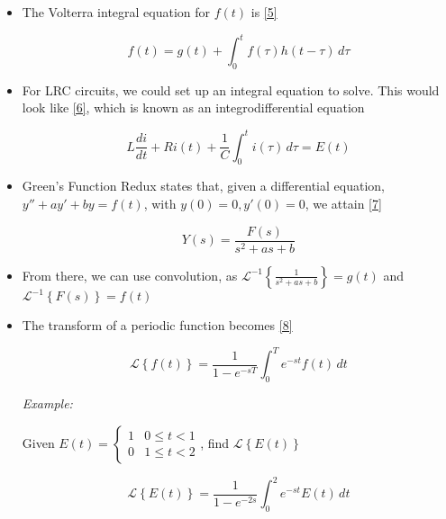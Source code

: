 \documentclass[12pt]{article}
\begin{document}
\begin{itemize}
  \item The Volterra integral equation for $f(t)$ is \eqref{5}

    \begin{equation}
      f(t)=g(t)+\int_0^t f(\tau)h(t-\tau)\,d\tau
      \label{5}
    \end{equation}

  \item For LRC circuits, we could set up an integral equation to solve. This would look like \eqref{6}, which is known as an integrodifferential equation

    \begin{equation}
      L\frac{di}{dt}+Ri(t)+\frac{1}{C}\int_0^ti(\tau)\,d\tau=E(t)
      \label{6}
    \end{equation}

  \item Green's Function Redux states that, given a differential equation, $y''+ay'+by=f(t)$, with $y(0)=0, y'(0)=0$, we attain \eqref{7}

    \begin{equation}
      Y(s)=\frac{F(s)}{s^2+as+b}
      \label{7}
    \end{equation}

  \item From there, we can use convolution, as $\mathcal{L}^{-1}\left\{ \frac{1}{s^2+as+b} \right\}=g(t)$ and $\mathcal{L}^{-1}\left\{ F(s) \right\}=f(t)$

  \item The transform of a periodic function becomes \eqref{8}

    \begin{equation}
      \mathcal{L}\left\{ f(t) \right\}=\frac{1}{1-e^{-sT}}\int_0^T e^{-st}f(t)\,dt
      \label{8}
    \end{equation}

    \textit{Example:}

    \begin{center}
      Given $E(t)=\left\{\begin{array}{ll} 1 & 0\leq t< 1\\ 0 & 1\leq t <2 \end{array}$, find $\mathcal{L}\left\{ E(t) \right\}$
    \end{center}

    \begin{equation}
      \mathcal{L}\left\{ E(t) \right\}=\frac{1}{1-e^{-2s}}\int_0^2e^{-st}E(t)\,dt
      \label{9}
    \end{equation}

\end{itemize}
\end{document}
